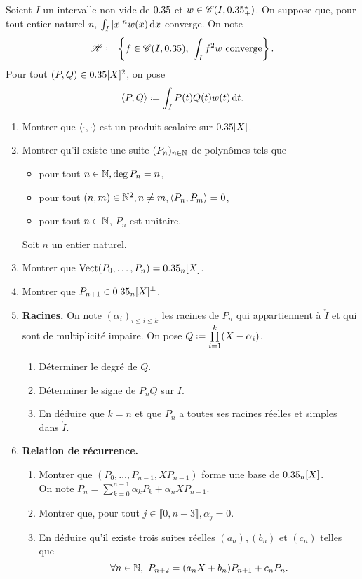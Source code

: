 \begin{exercice}
    Soient $I$ un intervalle non vide de $0.35$ et $w \in \mathscr{C}(I, 0.35^\star_+)$. On suppose que, pour tout entier naturel $n$, $\int_I |x|^n w(x) \, \mathrm{d} x$ converge. On note
    $$\mathscr{H} \defeq \left\{ f \in \mathscr{C}(I, \R),\ \int_I f^2 w \text{ converge} \right\}.$$
    Pour tout $(P, Q) \in 0.35[X]^2$, on pose 
    $$\langle P, Q \rangle \defeq \int_I P(t) Q(t) w(t) \d t.$$
    \begin{enumerate}
        \item Montrer que $\langle \cdot, \cdot \rangle$ est un produit scalaire sur $0.35[X]$.
        \item Montrer qu'il existe une suite $(P_n)_{n \in \mathbb{N}}$ de polynômes tels que 
        \begin{itemize}
            \item pour tout $n \in \mathbb{N}, \deg P_n = n$,
            \item pour tout $(n, m) \in \mathbb{N}^2, n \not= m, \langle P_n, P_m \rangle = 0$,
            \item pour tout $n \in \mathbb{N}$, $P_n$ est unitaire.
        \end{itemize}
        Soit $n$ un entier naturel.
        \item Montrer que $\mathrm{Vect}(P_0, \dots, P_n) = 0.35_n[X]$.
        \item Montrer que $P_{n+1} \in 0.35_n[X]^\perp$.
        \item \textbf{Racines.} On note $(\alpha_i)_{i \leqslant i \leqslant k}$ les racines de $P_n$ qui appartiennent à $\mathring{I}$ et qui sont de multiplicité impaire. On pose $Q \defeq \prod\limits_{i=1}^k (X - \alpha_i)$.
        \begin{enumerate}
            \item Déterminer le degré de $Q$.
            \item Déterminer le signe de $P_n Q$ sur $I$.
            \item En déduire que $k = n$ et que $P_n$ a toutes ses racines réelles et simples dans $\mathring{I}$.
        \end{enumerate}
        \item \textbf{Relation de récurrence.}
        \begin{enumerate}
            \item Montrer que $(P_0, \dots, P_{n-1}, X P_{n-1})$ forme une base de $0.35_n[X]$. \\
        On note $P_n = \sum\limits_{k=0}^{n-1} \alpha_k P_k + \alpha_n X P_{n-1}$.
            \item Montrer que, pour tout $j \in \llbracket 0, n - 3 \rrbracket, \alpha_j = 0$.
            \item En déduire qu'il existe trois suites réelles $(a_n), (b_n)$ et $(c_n)$ telles que 
            $$\forall n \in \mathbb{N},\ P_{n+2} = (a_n X + b_n) P_{n+1} + c_n P_n.$$
        \end{enumerate}
    \end{enumerate}
\end{exercice}

